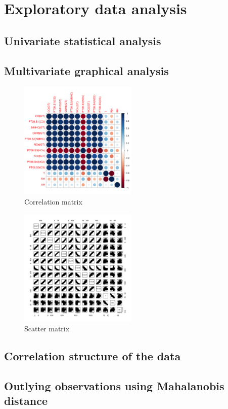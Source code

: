 \section{Exploratory data analysis}
\subsection{Univariate statistical analysis}


\subsection{Multivariate graphical analysis}
\begin{figure}[H]
  \centering
  \includegraphics[width=0.5\textwidth]{figs/corr.png}
  \caption{Correlation matrix}
  \label{fig:corr}
\end{figure}

\begin{figure}[H]
  \centering
  \includegraphics[width=0.5\textwidth]{figs/scatter_matrix.png}
  \caption{Scatter matrix}
  \label{fig:scatter_matrix}
\end{figure}

\subsection{Correlation structure of the data}

\subsection{Outlying observations using Mahalanobis distance}
